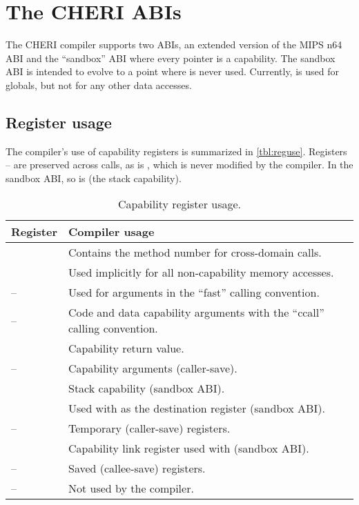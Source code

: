 \chapter{The CHERI ABIs}
\label{chp:abis}

The CHERI compiler supports two ABIs, an extended version of the MIPS n64 ABI and the ``sandbox'' ABI where every pointer is a capability.
The sandbox ABI is intended to evolve to a point where  is never used.
Currently,  is used for globals, but not for any other data accesses.

\section{Register usage}

The compiler's use of capability registers is summarized in \autoref{tbl:reguse}.
Registers -- are preserved across calls, as is , which is never modified by the compiler.
In the sandbox ABI, so is  (the stack capability).

\begin{table}
	\begin{center}
		\begin{tabu}{ll}
			\toprule
			\headerrow
			Register             & Compiler usage \\
			\midrule
			             & Contains the method number for cross-domain calls.\\
			             & Used implicitly for all non-capability memory accesses.\\
			--  & Used for arguments in the ``fast'' calling convention. \\
			--   & Code and data capability arguments with the ``ccall'' calling convention. \\
			             & Capability return value. \\
			--  & Capability arguments (caller-save). \\
			            & Stack capability (sandbox ABI). \\
			            & Used with  as the destination register (sandbox ABI). \\
			-- & Temporary (caller-save) registers.\\
			            & Capability link register used with  (sandbox ABI).\\
			-- & Saved (callee-save) registers. \\
			-- & Not used by the compiler.\\
			\bottomrule
		\end{tabu}
		\caption{\label{tbl:reguse}Capability register usage.}
	\end{center}
\end{table}

